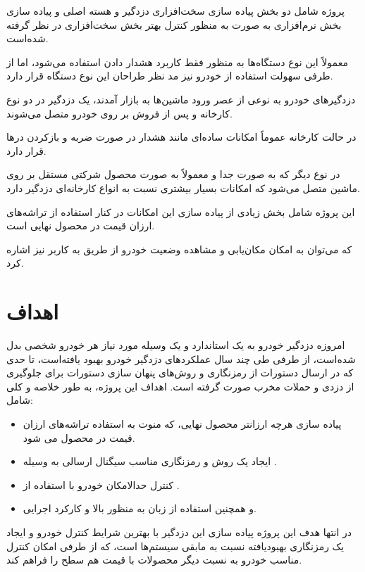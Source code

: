 \documentclass[a4paper,12pt]{report}
\begin{document}
	پروژه شامل دو بخش پیاده سازی سخت‌افزاری دزدگیر و هسته اصلی و پیاده سازی بخش نرم‌افزاری به صورت
	به منظور کنترل بهتر بخش سخت‌افزاری در نظر گرفته شده‌است.

	معمولاً این نوع دستگاه‌ها به منظور فقط کاربرد هشدار دادن استفاده می‌شود، اما از طرفی سهولت استفاده از خودرو نیز مد نظر طراحان این نوع دستگاه قرار دارد.

	دزدگیر‌های خودرو به نوعی از عصر ورود ماشین‌ها به بازار آمدند، یک دزدگیر در دو نوع کارخانه و پس از فروش بر روی خودرو متصل می‌شوند.

	در حالت کارخانه عموماً امکانات ساده‌ای مانند هشدار در صورت ضربه و بازکردن درها قرار دارد.

	در نوع دیگر که به صورت جدا و معمولاً به صورت محصول شرکتی مستقل بر روی ماشین متصل می‌شود که امکانات بسیار بیشتری نسبت به انواع کارخانه‌ای دزدگیر دارد.

	این پروژه شامل بخش زیادی از پیاده سازی این امکانات در کنار استفاده از تراشه‌های ارزان قیمت در محصول نهایی است.

	که می‌توان به امکان مکان‌یابی و مشاهده وضعیت خودرو از طریق
	به کاربر نیز اشاره کرد.


	\section{
	اهداف
	}\label{sec2:chap1}
	امروزه دزدگیر خودرو به یک استاندارد و یک وسیله مورد نیاز هر خودرو شخصی بدل شده‌است،
	از طرفی طی چند سال عملکرد‌های دزدگیر خودرو بهبود یافته‌است،‌ تا حدی که در ارسال دستورات
	از رمزنگاری و روش‌های پنهان سازی دستورات برای جلوگیری از دزدی و حملات مخرب صورت گرفته است.
	اهداف این پروژه، به طور خلاصه و کلی شامل:
	\begin{itemize}[nosep]
		\item
		پیاده سازی هرچه ارزانتر محصول نهایی، که منوت به استفاده تراشه‌های ارزان قیمت در محصول می شود.
		\item
		ایجاد یک روش و رمزنگاری مناسب سیگنال ارسالی به وسیله
		.
		\item
		کنترل حدالامکان خودرو با استفاده از
		.
		\item
		و همچنین استفاده از زبان
		به منظور
		بالا و کارکرد اجرایی.
	\end{itemize}

		در انتها هدف این پروژه پیاده سازی این دزدگیر با بهترین شرایط کنترل خودرو و ایجاد یک رمزنگاری بهبودیافته نسبت به مابقی سیستم‌ها است، که از طرفی امکان کنترل مناسب خودرو به نسبت دیگر محصولات با قیمت هم سطح را فراهم کند.
\end{document}
